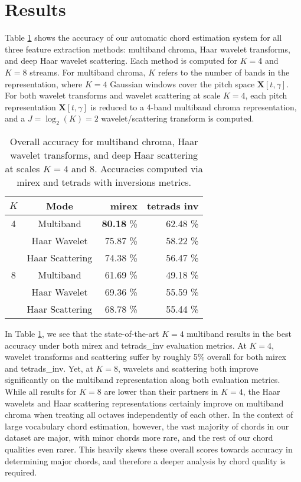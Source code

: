 
\section{Results}
\label{sec:results}

Table \ref{table:overall-scores} shows the accuracy of our automatic chord estimation system for all three feature extraction methods: multiband chroma, Haar wavelet transforms, and deep Haar wavelet scattering. Each method is computed for $K=4$ and $K=8$ streams. For multiband chroma, $K$ refers to the number of bands in the representation, where $K=4$ Gaussian windows cover the pitch space $\mathbf{X}[t, \gamma]$. For both wavelet transforms and wavelet scattering at scale $K=4$, each pitch representation $\mathbf{X}[t,\gamma]$ is reduced to a 4-band multiband chroma representation, and a $J=\log_2(K)=2$ wavelet/scattering transform is computed. 

\begin{table}
	\begin{center}
	\begin{tabular} {| c | c | r  | r |}
	\hline
	$K$ & Mode & mirex & tetrads inv \\
	\hline
	4 & Multiband & \textbf{80.18} \% & 62.48 \% \\
	& Haar Wavelet & 75.87 \%  & 58.22 \%\\
	& Haar Scattering & 74.38 \%  & 56.47 \% \\
	\hline
	8 & Multiband & 61.69 \% & 49.18 \% \\
	& Haar Wavelet & 69.36 \% & 55.59 \% \\
	& Haar Scattering & 68.78 \% & 55.44 \% \\
	\hline
	\end{tabular}
	\end{center}
	\protect\caption{Overall accuracy for multiband chroma, Haar wavelet transforms, and deep Haar scattering at scales $K=4$ and $8$. Accuracies computed via mirex and tetrads with inversions metrics.
	\label{table:overall-scores}}
\end{table}

In Table \ref{table:overall-scores}, we see that the state-of-the-art $K=4$ multiband results in the best accuracy under both mirex  and tetrads\_inv  evaluation metrics. At $K=4$, wavelet transforms and scattering suffer by roughly 5\% overall for both mirex and tetrads\_inv. Yet, at $K=8$, wavelets and scattering both improve significantly on the multiband representation along both evaluation metrics. While all results for $K=8$ are lower than their partners in $K=4$, the Haar wavelets and Haar scattering representations certainly improve on multiband chroma when treating all octaves independently of each other. In the context of large vocabulary chord estimation, however, the vast majority of chords in our dataset are major, with minor chords more rare, and the rest of our chord qualities even rarer. This heavily skews these overall scores towards accuracy in determining major chords, and therefore a deeper analysis by chord quality is required.

